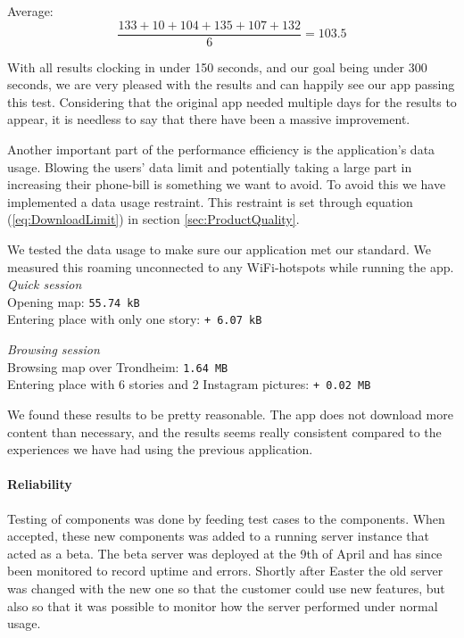 Average: 
\begin{equation}
\frac{133 + 10 + 104 + 135 + 107 + 132}{6} = {103.5}
\end{equation}

With all results clocking in under 150 seconds, and our goal being under 300 seconds, we are very pleased with the results and can happily see our app passing this test. Considering that the original app needed multiple days for the results to appear, it is needless to say that there have been a massive improvement.


Another important part of the performance efficiency is the application's data usage. Blowing the users' data limit and potentially taking a large part in increasing their phone-bill is something we want to avoid. To avoid this we have implemented a data usage restraint. This restraint is set through equation (\ref{eq:DownloadLimit}) in section \ref{sec:ProductQuality}.

We tested the data usage to make sure our application met our standard. We measured this roaming unconnected to any WiFi-hotspots while running the app.\\

\emph{Quick session}\\
Opening map: \texttt{55.74 kB}\\
Entering place with only one story: \texttt{+ 6.07 kB}

\emph{Browsing session}\\
Browsing map over Trondheim: \texttt{1.64 MB}\\
Entering place with 6 stories and 2 Instagram pictures: \texttt{+ 0.02 MB}

We found these results to be pretty reasonable. The app does not download more content than necessary, and the results seems really consistent compared to the experiences we have had using the previous application.

\paragraph{Reliability}

Testing of components was done by feeding test cases to the components. When accepted, these new components was added to a running server instance that acted as a beta. The beta server was deployed at the 9th of April and has since been monitored to record uptime and errors. Shortly after Easter the old server was changed with the new one so that the customer could use new features, but also so that it was possible to monitor how the server performed under normal usage.

